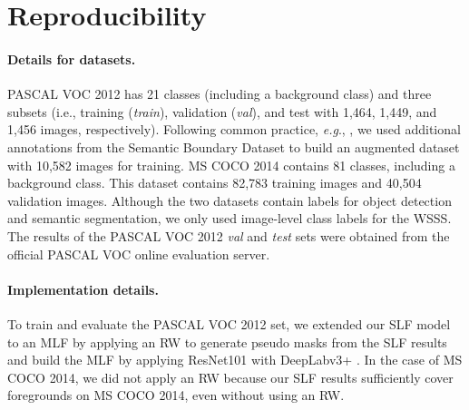 \documentclass[11pt]{article}
\begin{document}
 
\clearpage 


\clearpage 
	
	
	 
\appendix
	 
 

\section{Reproducibility}

\paragraph{Details for datasets.} 
PASCAL VOC 2012 has 21 classes (including a background class) and three subsets (i.e., training (\emph{train}), validation (\emph{val}), and test with 1,464, 1,449, and 1,456 images, respectively). Following common practice, \emph{e.g}., \citet{ahn2018learning, wang2020self, araslanov2020single, zhang2020reliability, lee2021anti, zhang2021complementary}, we used additional annotations from the Semantic Boundary Dataset \cite{hariharan2011semantic} to build an augmented dataset with 10,582 images for training. MS COCO 2014 contains 81 classes, including a background class. This dataset contains 82,783 training images and 40,504 validation images. Although the two datasets contain labels for object detection and semantic segmentation, we only used image-level class labels for the WSSS. The results of the PASCAL VOC 2012 \emph{val} and \emph{test} sets were obtained from the official PASCAL VOC online evaluation server. 
 

\paragraph{Implementation details.} 


To train and evaluate the PASCAL VOC 2012 set, we extended our SLF model to an MLF by applying an RW \cite{ahn2019weakly} to generate pseudo masks from the SLF results and build the MLF by applying ResNet101 with DeepLabv3+ \cite{chen2018encoder}. In the case of MS COCO 2014, we did not apply an RW because our SLF results sufficiently cover foregrounds on MS COCO 2014, even without using an RW. 
\end{document}
